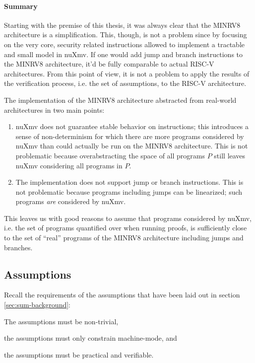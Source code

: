 \paragraph{Summary}

Starting with the premise of this thesis, it was always clear that the MINRV8 architecture is a simplification.
This, though, is not a problem since by focusing on the very core, security related instructions allowed to implement a tractable and small model in nuXmv.
If one would add jump and branch instructions to the MINRV8 architecture, it'd be fully comparable to actual RISC-V architectures.
From this point of view, it is not a problem to apply the results of the verification process, i.e. the set of assumptions, to the RISC-V architecture.

The implementation of the MINRV8 architecture abstracted from real-world architectures in two main points:
\begin{enumerate}
    \item nuXmv does not guarantee stable behavior on  instructions; this introduces a sense of non-determinism for which there are more programs considered by nuXmv than could actually be run on the MINRV8 architecture.
    This is not problematic because overabstracting the space of all programs $ P $ still leaves nuXmv considering all programs in $ P $.
    \item The implementation does not support jump or branch instructions.
    This is not problematic because programs including jumps can be linearized; such programs \textit{are} considered by nuXmv.
\end{enumerate}

This leaves us with good reasons to assume that programs considered by nuXmv, i.e. the set of programs quantified over when running proofs, is sufficiently close to the set of \enquote{real} programs of the MINRV8 architecture including jumps and branches.

\subsection{Assumptions}

Recall the requirements of the assumptions that have been laid out in section \ref{sec:sum-background}:
\begin{enumerate*}
    \item The assumptions must be non-trivial,
    \item the assumptions must only constrain machine-mode, and
    \item the assumptions must be practical and verifiable.
\end{enumerate*}

